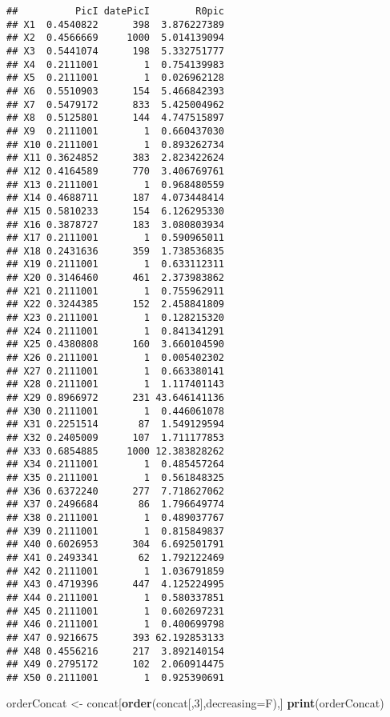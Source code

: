 \documentclass[
]{article}
\newenvironment{Shaded}{\begin{snugshade}}{\end{snugshade}}
\newcommand{\DataTypeTok}[1]{\textcolor[rgb]{0.13,0.29,0.53}{#1}}
\newcommand{\DecValTok}[1]{\textcolor[rgb]{0.00,0.00,0.81}{#1}}
\newcommand{\KeywordTok}[1]{\textcolor[rgb]{0.13,0.29,0.53}{\textbf{#1}}}
\newcommand{\NormalTok}[1]{#1}
\newcommand{\StringTok}[1]{\textcolor[rgb]{0.31,0.60,0.02}{#1}}
\begin{document}
\begin{verbatim}
##          PicI datePicI        R0pic
## X1  0.4540822      398  3.876227389
## X2  0.4566669     1000  5.014139094
## X3  0.5441074      198  5.332751777
## X4  0.2111001        1  0.754139983
## X5  0.2111001        1  0.026962128
## X6  0.5510903      154  5.466842393
## X7  0.5479172      833  5.425004962
## X8  0.5125801      144  4.747515897
## X9  0.2111001        1  0.660437030
## X10 0.2111001        1  0.893262734
## X11 0.3624852      383  2.823422624
## X12 0.4164589      770  3.406769761
## X13 0.2111001        1  0.968480559
## X14 0.4688711      187  4.073448414
## X15 0.5810233      154  6.126295330
## X16 0.3878727      183  3.080803934
## X17 0.2111001        1  0.590965011
## X18 0.2431636      359  1.738536835
## X19 0.2111001        1  0.633112311
## X20 0.3146460      461  2.373983862
## X21 0.2111001        1  0.755962911
## X22 0.3244385      152  2.458841809
## X23 0.2111001        1  0.128215320
## X24 0.2111001        1  0.841341291
## X25 0.4380808      160  3.660104590
## X26 0.2111001        1  0.005402302
## X27 0.2111001        1  0.663380141
## X28 0.2111001        1  1.117401143
## X29 0.8966972      231 43.646141136
## X30 0.2111001        1  0.446061078
## X31 0.2251514       87  1.549129594
## X32 0.2405009      107  1.711177853
## X33 0.6854885     1000 12.383828262
## X34 0.2111001        1  0.485457264
## X35 0.2111001        1  0.561848325
## X36 0.6372240      277  7.718627062
## X37 0.2496684       86  1.796649774
## X38 0.2111001        1  0.489037767
## X39 0.2111001        1  0.815849837
## X40 0.6026953      304  6.692501791
## X41 0.2493341       62  1.792122469
## X42 0.2111001        1  1.036791859
## X43 0.4719396      447  4.125224995
## X44 0.2111001        1  0.580337851
## X45 0.2111001        1  0.602697231
## X46 0.2111001        1  0.400699798
## X47 0.9216675      393 62.192853133
## X48 0.4556216      217  3.892140154
## X49 0.2795172      102  2.060914475
## X50 0.2111001        1  0.925390691
\end{verbatim}

\begin{Shaded}
\begin{Highlighting}[]
\NormalTok{orderConcat <-}\StringTok{ }\NormalTok{concat[}\KeywordTok{order}\NormalTok{(concat[,}\DecValTok{3}\NormalTok{],}\DataTypeTok{decreasing=}\NormalTok{F),]}
\KeywordTok{print}\NormalTok{(orderConcat)}
\end{Highlighting}
\end{Shaded}
\end{document}
